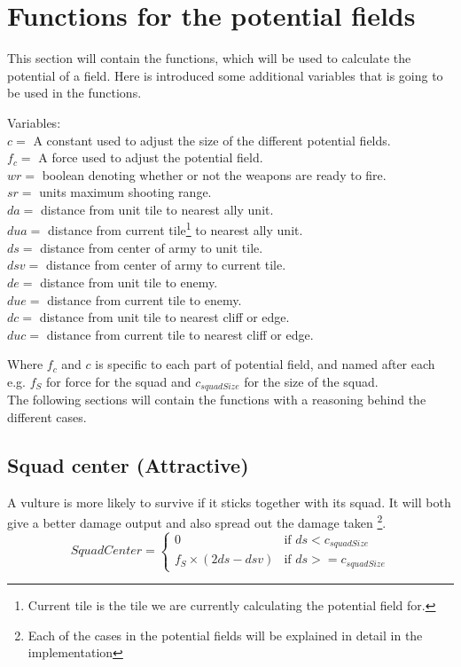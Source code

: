 \section{Functions for the potential fields}
	This section will contain the functions, which will be used to calculate the potential of a field. Here is introduced some additional variables that 
	is going to be used in the functions.
	
	\label{cha3_variables}
	Variables:\\
	$c =$ A constant used to adjust the size of the different potential fields.\\ 
	$f_c =$ A force used to adjust the potential field.\\
	$wr =$ boolean denoting whether or not the weapons are ready to fire.\\
	$sr =$ units maximum shooting range.\\
	$da =$ distance from unit tile to nearest ally unit.\\
	$dua =$ distance from current tile\footnote{Current tile is the tile we are currently calculating the potential field for.} to nearest ally unit.\\
	$ds =$ distance from center of army to unit tile.\\
	$dsv =$ distance from center of army to current tile.\\
	$de =$ distance from unit tile to enemy.\\
	$due =$ distance from current tile to enemy.\\
	$dc =$ distance from unit tile to nearest cliff or edge. \\
	$duc =$ distance from current tile to nearest cliff or edge. 
	
	
	
	Where $f_c$ and $c$ is specific to each part of potential field, and named after each e.g. $f_{S}$ for force for the squad and $c_{squadSize}$ for the size of the squad.\\
	
	The following sections will contain the functions with a reasoning behind the different cases.
	
	\subsection*{Squad center (Attractive)}
		\label{SCA_label}A vulture is more likely to survive if it sticks together with its squad. 
		It will both give a better damage output and also spread out the damage taken
		\footnote{Each of the cases in the potential fields will be explained in detail in the implementation}.
		\begin{displaymath}
			SquadCenter  = \begin{cases}
					0 & \text{if } ds < c_{squadSize} \\
					f_{S} \times (2ds - dsv) & \text{if } ds >= c_{squadSize}
				\end{cases}		
		\end{displaymath}
		
